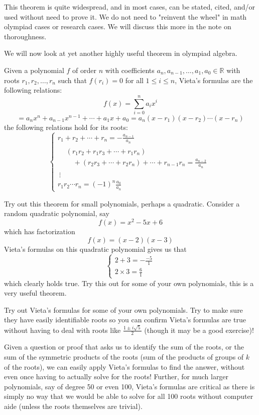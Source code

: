 This theorem is quite widespread, and in most cases, can be stated, cited, and/or used without need to prove it. We do not need to "reinvent the wheel" in math olympiad cases or research cases. We will discuss this more in the note on thoroughness. 

We will now look at yet another highly useful theorem in olympiad algebra.
\begin{theorem}
Given a polynomial $f$ of order $n$ with coefficients $a_n, a_{n-1}, \ldots, a_1, a_0 \in \mathbb{R}$ with roots $r_1, r_2, \ldots, r_n$ such that $f(r_i) = 0$ for all $1 \leq i \leq n$, Vieta's formulas are the following relations: 
\[
f(x) = \sum_{i=0}^{n} a_ix^i 
\]
\[
= a_nx^n + a_{n-1}x^{n-1} + \cdots + a_1x + a_0 = a_n(x-r_1)(x-r_2)\cdots(x-r_n)
\]
the following relations hold for its roots:
\[
\begin{cases}
r_1 + r_2 + \cdots + r_n = -\frac{a_{n-1}}{a_n} \\[1ex]
\begin{aligned}
&(r_1r_2 + r_1r_3 + \cdots + r_1r_n) \\
&\quad + (r_2r_3 + \cdots + r_2 r_n) + \cdots + r_{n-1}r_n = \frac{a_{n-2}}{a_n}
\end{aligned} \\[2.5ex]
~\vdots  \\[1ex]
r_1r_2\cdots r_n = (-1)^n \frac{a_0}{a_n}
\end{cases}
\]
\end{theorem}
Try out this theorem for small polynomials, perhaps a quadratic. Consider a random quadratic polynomial, say 
\[
f(x) = x^2 - 5x + 6
\]
which has factorization
\[
f(x) = (x-2)(x-3)
\]
Vieta's formulas on this quadratic polynomial gives us that 
\[
\begin{cases}
2 + 3 = -\frac{-5}{1} \\
2 \times 3 = \frac{6}{1}
\end{cases}
\]
which clearly holds true. Try this out for some of your own polynomials, this is a very useful theorem. 

\begin{exercise}
    Try out Vieta's formulas for some of your own polynomials. Try to make sure they have easily identifiable roots so you can confirm Vieta's formulas are true without having to deal with roots like $\frac{1 \pm i\sqrt{5}}{2}$ (though it may be a good exercise)!
\end{exercise}

Given a question or proof that asks us to identify the sum of the roots, or the sum of the symmetric products of the roots (sum of the products of groups of $k$ of the roots), we can easily apply Vieta's formulas to find the answer, without even once having to actually solve for the roots! Further, for much larger polynomials, say of degree 50 or even 100, Vieta's formulas are critical as there is simply no way that we would be able to solve for all 100 roots without computer aide (unless the roots themselves are trivial).

